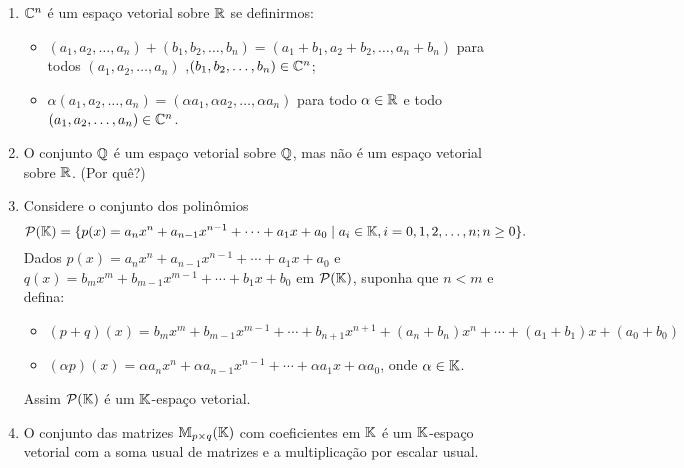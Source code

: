 \begin{exemplo}
\begin{enumerate}[label={\arabic*})]
\begin{itemize}
		\end{itemize}
		\item $\mathbb{C}^n$ \'e um espa\c{c}o vetorial sobre $\mathbb{R}$ se definirmos:
		\begin{itemize}
			\item $(a_1, a_2, \dots, a_n) + (b_1, b_2, \dots,b_n) = (a_1 + b_1, a_2 + b_2,\dots, a_n + b_n)$ para todos $(a_1, a_2, \dots,a_n)$ ,$(b_1, b_2, \dots,b_n) \in \mathbb{C}^n$;
			\item $\alpha (a_1, a_2, \dots,a_n) = (\alpha a_1, \alpha a_2, \dots, \alpha a_n)$ para todo $\alpha \in \mathbb{R}$ e todo $(a_1, a_2, \dots, a_n) \in \mathbb{C}^n$.
		\end{itemize}
		\item O conjunto $\mathbb{Q}$ \'e um espa\c{c}o vetorial sobre $\mathbb{Q}$, mas n\~ao \'e um espa\c{c}o vetorial sobre $\mathbb{R}$. (Por qu\^e?)
		\item Considere o conjunto dos polin\^omios
		\[
			\mathcal{P}(\mathbb{K}) = \{ p(x) = a_nx^n + a_{n - 1}x^{n - 1} + \cdots + a_1x + a_0 \mid a_i \in \mathbb{K}, i = 0, 1, 2, \dots, n; n \ge 0 \}.
		\]
		Dados $p(x) = a_nx^n + a_{n - 1}x^{n - 1} + \cdots + a_1x + a_0$ e $q(x) = b_mx^m + b_{m - 1}x^{m - 1} + \cdots + b_1x + b_0$ em $\mathcal{P}(\mathbb{K})$, suponha que $n < m$ e defina:
		\begin{itemize}
			\item $(p + q)(x) = b_mx^m + b_{m - 1}x^{m - 1} + \cdots + b_{n + 1}x^{n + 1} + (a_n + b_n)x^n + \cdots + (a_1 + b_1)x + (a_0 + b_0)$
			\item $(\alpha p)(x) = \alpha a_nx^n + \alpha a_{n - 1}x^{n - 1} + \cdots + \alpha a_1x + \alpha a_0$, onde $\alpha \in \mathbb{K}$.
		\end{itemize}
		Assim $\mathcal{P}(\mathbb{K})$ \'e um $\mathbb{K}$-espa\c{c}o vetorial.
		\item O conjunto das matrizes $\mathbb{M}_{p \times q}(\mathbb{K})$ com coeficientes em $\mathbb{K}$ \'e um $\mathbb{K}$-espa\c{c}o vetorial com a soma usual de matrizes e a multiplica\c{c}\~ao por escalar usual.



\end{enumerate}
\end{exemplo}
